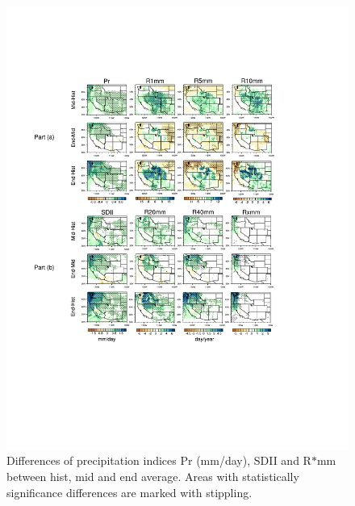 \documentclass{ametsoc}
\begin{document}
\begin{figure}
\begin{center}
\includegraphics[width=6in, trim={3.5cm 6.5cm 3.5cm 2.0cm},clip]{wd_index_all_years_part1.pdf} %
\caption{Differences of precipitation indices Pr (mm/day), SDII and R$\ast$mm between \textsf{hist}, \textsf{mid} and \textsf{end} average. Areas with statistically significance differences are marked with stippling.}
\label{fig:difIndex1}
\end{center}
\end{figure}
\end{document}
